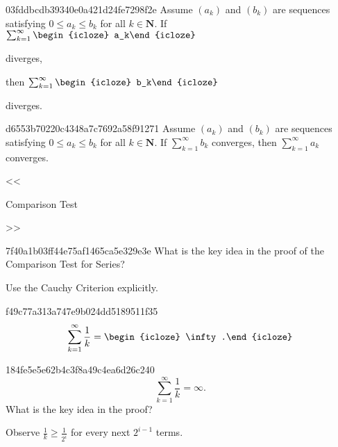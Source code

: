 \begin{note}{03fddbcdb39340e0a421d24fe7298f2e}
    Assume \({ (a_k) }\) and \({ (b_k) }\) are sequences satisfying \({ 0 \leq a_k \leq b_k }\) for all \({ k \in \mathbf{N} }\).
    If \({ \sum_{k=1}^{\infty} \begin{icloze}{1}a_k\end{icloze} }\) \begin{icloze}{2}diverges,\end{icloze} then \({ \sum_{k=1}^{\infty} \begin{icloze}{1}b_k\end{icloze} }\) \begin{icloze}{2}diverges.\end{icloze}
\end{note}

\begin{note}{d6553b70220c4348a7c7692a58f91271}
    Assume \({ (a_k) }\) and \({ (b_k) }\) are sequences satisfying \({ 0 \leq a_k \leq b_k }\) for all \({ k \in \mathbf{N} }\).
    If \({ \sum_{k=1}^{\infty} b_k }\) converges, then \({ \sum_{k=1}^{\infty} a_k }\) converges.

    \begin{center}
        \tiny
        <<\begin{icloze}{1}Comparison Test\end{icloze}>>
    \end{center}
\end{note}

\begin{note}{7f40a1b03ff44e75af1465ca5e329e3e}
    What is the key idea in the proof of the Comparison Test for Series?

    \begin{cloze}{1}
        Use the Cauchy Criterion explicitly.
    \end{cloze}
\end{note}

\begin{note}{f49c77a313a747e9b024dd5189511f35}
    \[
        \sum_{k=1}^{\infty} \frac{1}{k} = \begin{icloze}{1}\infty.\end{icloze}
    \]
\end{note}

\begin{note}{184fe5e5e62b4c3f8a49c4ea6d26c240}
    \[
        \sum_{k=1}^{\infty} \frac{1}{k} = \infty.
    \]
    What is the key idea in the proof?

    \begin{cloze}{1}
        Observe \({ \frac{1}{k} \geqslant \frac{1}{2^{i}} }\) for every next \({ 2^{i - 1} }\) terms.
    \end{cloze}
\end{note}

